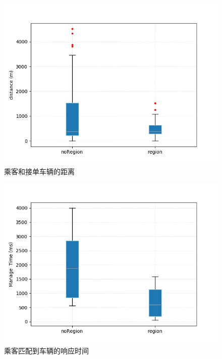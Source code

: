 \begin{figure}
  \centering
  \includegraphics[width=1.0\textwidth]{figures/distance}
  \caption{乘客和接单车辆的距离}\label{fig:distance}
\end{figure}

\begin{figure}
  \centering
  \includegraphics[width=1.0\textwidth]{figures/manageTime}
  \caption{乘客匹配到车辆的响应时间}\label{fig:manageTime}
\end{figure}

